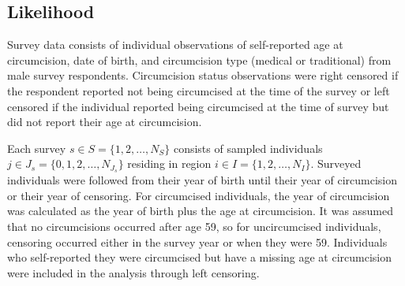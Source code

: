\documentclass{article}
\begin{document}
\begin{appendix}

\subsection{Likelihood}
\label{sec::likelihood}


Survey data consists of individual observations of self-reported age at circumcision, date of birth, and circumcision type (medical or traditional) from male survey respondents. Circumcision status observations were right censored if the respondent reported not being circumcised at the time of the survey or left censored if the individual reported being circumcised at the time of survey but did not report their age at circumcision.

\noindent Each survey $s \in S = \{1, 2, \ldots, N_S\}$ consists of sampled individuals $j \in J_s = \{0, 1, 2, \ldots, N_{J_s}\}$ residing in region $i \in I = \{1, 2, \ldots, N_I\}$. Surveyed individuals were followed from their year of birth until their year of circumcision or their year of censoring. For circumcised individuals, the year of circumcision was calculated as the year of birth plus the age at circumcision. It was assumed that no circumcisions occurred after age 59, so for uncircumcised individuals, censoring occurred either in the survey year or when they were 59. Individuals who self-reported they were circumcised but have a missing age at circumcision were included in the analysis through left censoring. 


\end{appendix}
\end{document}
